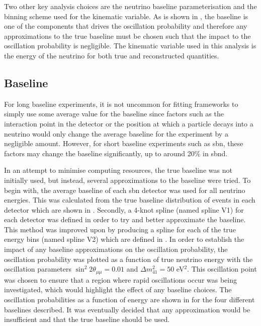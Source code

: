 Two other key analysis choices are the neutrino baseline parameterisation and the binning scheme used for the kinematic variable. As is shown in , the baseline is one of the components that drives the oscillation probability and therefore any approximations to the true baseline must be chosen such that the impact to the oscillation probability is negligible. The kinematic variable used in this analysis is the energy of the neutrino for both true and reconstructed quantities.

\subsection{Baseline}
For long baseline experiments, it is not uncommon for fitting frameworks to simply use some average value for the baseline since factors such as the interaction point in the detector or the position at which a particle decays into a neutrino would only change the average baseline for the experiment by a negligible amount. However, for short baseline experiments such as \gls{sbn}, these factors may change the baseline significantly, up to around 20\% in \gls{sbnd}. 

In an attempt to minimise computing resources, the true baseline was not initially used, but instead, several approximations to the baseline were tried. To begin with, the average baseline of each \gls{sbn} detector was used for all neutrino energies. This was calculated from the true baseline distribution of \numu events in each detector which are shown in . Secondly, a 4-knot spline (named spline V1) for each detector was defined in order to try and better approximate the baseline. This method was improved upon by producing a spline for each of the true energy bins (named spline V2) which are defined in . In order to establish the impact of any baseline approximations on the oscillation probability, the oscillation probability was plotted as a function of true neutrino energy with the oscillation parameters $\sin^2{2\theta_{\mu\mu}} = 0.01$ and $\Delta m^2_{41} = 50$ eV$^2$. This oscillation point was chosen to ensure that a region where rapid oscillations occur was being investigated, which would highlight the effect of any baseline choices. The oscillation probabilities as a function of energy are shown in  for the four different baselines described. It was eventually decided that any approximation would be insufficient and that the true baseline should be used. 

